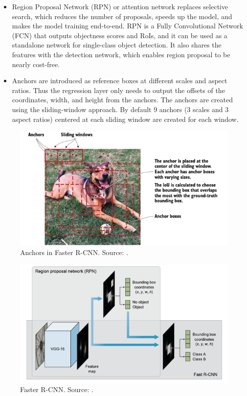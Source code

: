 \documentclass[a4paper, 11pt, oneside]{article}
\begin{document}
\begin{itemize}
  \item Region Proposal Network (RPN) or attention network replaces selective search, which reduces the number of
  proposals, speeds up the model, and makes the model training end-to-end. RPN is a Fully Convolutional Network (FCN)
  \cite{long2015fully} that outputs objectness scores and RoIs, and it can be used as a standalone network for
  single-class object detection. It also shares the features with the detection network, which enables region proposal
  to be nearly cost-free.
  \item Anchors are introduced as reference boxes at different scales and aspect ratios. Thus the regression layer
  only needs to output the offsets of the coordinates, width, and height from the anchors. The anchors are created using
  the sliding-window approach. By default 9 anchors (3 scales and 3 aspect ratios) centered at each sliding window are
  created for each window.
\end{itemize}

\begin{figure}[ht]
  \begin{center}
    \includegraphics[width=.8\textwidth]{anchors.png}
  \end{center}
  \caption{Anchors in Faster R-CNN. Source: \cite{elgendy2020deep}.}
\end{figure}

\begin{figure}[ht]
  \begin{center}
    \includegraphics[width=.8\textwidth]{faster_r_cnn.png}
  \end{center}
  \caption{Faster R-CNN. Source: \cite{elgendy2020deep}.}
\end{figure}
\end{document}
